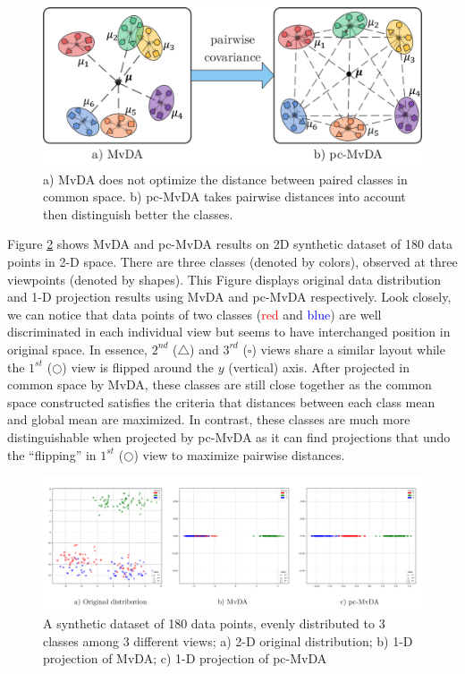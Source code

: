        \begin{figure}[htbp]
            \centering
            \includegraphics[width=0.7\linewidth]{Figs/pc-MvDA.png}
            \caption{a) MvDA does not optimize the distance between paired classes in common space. b) pc-MvDA takes pairwise distances into account then distinguish better the classes.}
            \label{fig:pc-MvDA}
        \end{figure}

        Figure \ref{fig:synthetic1} shows MvDA and pc-MvDA results on 2D synthetic dataset of 180 data points in 2-D space.
        There are three classes (denoted by colors), observed at three viewpoints (denoted by shapes).
        This Figure displays original data distribution and 1-D projection results using MvDA and pc-MvDA respectively.
        Look closely, we can notice that data points of two classes (\textcolor{red}{red} and \textcolor{blue}{blue}) are well discriminated in each individual view but seems to have interchanged position in original space.
        In essence, $2^{nd}$ ($\bigtriangleup$) and $3^{rd}$ ($\square$) views share a similar layout while the $1^{st}$ ($\bigcirc$) view is flipped around the $y$ (vertical) axis.
        After projected in common space by MvDA, these classes are still close together as the common space constructed satisfies the criteria that distances between each class mean and global mean are maximized.
        In contrast, these classes are much more distinguishable when projected by pc-MvDA as it can find projections that undo the ``flipping'' in $1^{st}$ ($\bigcirc$) view to maximize pairwise distances.

        \begin{figure}[htbp]
            \centering
            \includegraphics[width=1\linewidth]{Figs/Synthetic1.png}
            \caption{A synthetic dataset of 180 data points, evenly distributed to 3 classes among 3 different views; a) 2-D original distribution; b) 1-D projection of MvDA; c) 1-D projection of pc-MvDA}
            \label{fig:synthetic1}
        \end{figure}

